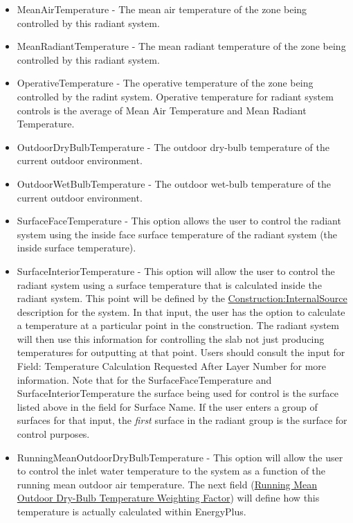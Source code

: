 \begin{itemize}
\item
  MeanAirTemperature - The mean air temperature of the zone being controlled by this radiant system.
\item
  MeanRadiantTemperature - The mean radiant temperature of the zone being controlled by this radiant system.
\item
  OperativeTemperature - The operative temperature of the zone being controlled by the radint system. Operative temperature for radiant system controls is the average of Mean Air Temperature and Mean Radiant Temperature.
\item
  OutdoorDryBulbTemperature - The outdoor dry-bulb temperature of the current outdoor environment.
\item
  OutdoorWetBulbTemperature - The outdoor wet-bulb temperature of the current outdoor environment.
\item
  SurfaceFaceTemperature - This option allows the user to control the radiant system using the inside face surface temperature of the radiant system (the inside surface temperature).
\item
  SurfaceInteriorTemperature - This option will allow the user to control the radiant system using a surface temperature that is calculated inside the radiant system.  This point will be defined by the  \hyperref[constructioninternalsource]{Construction:InternalSource} description for the system.  In that input, the user has the option to calculate a temperature at a particular point in the construction.  The radiant system will then use this information for controlling the slab not just producing temperatures for outputting at that point.  Users should consult the input for Field: Temperature Calculation Requested After Layer Number for more information.  Note that for the SurfaceFaceTemperature and SurfaceInteriorTemperature the surface being used for control is the surface listed above in the field for Surface Name.  If the user enters a group of surfaces for that input, the \emph{first} surface in the radiant group is the surface for control purposes.
\item
  RunningMeanOutdoorDryBulbTemperature - This option will allow the user to control the inlet water temperature to the system as a function of the running mean outdoor air temperature.  The next field (\hyperref[field-running-mean-outdoor-dry-bulb-temperature-weighting-factor]{Running Mean Outdoor Dry-Bulb Temperature Weighting Factor}) will define how this temperature is actually calculated within EnergyPlus.
\end{itemize}

